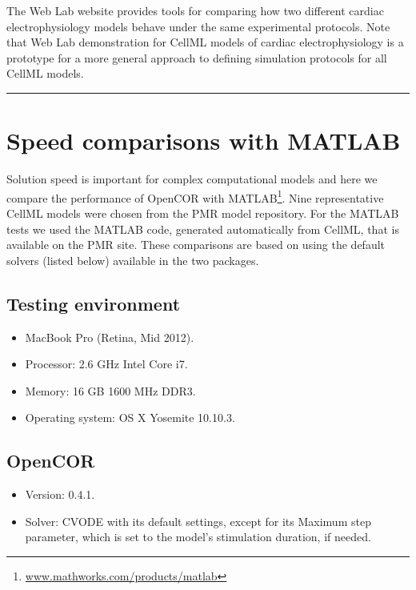 \documentclass[a4paper,10pt,english]{sphinxmanual}
\begin{document}
The Web Lab website provides tools for comparing how two different cardiac electrophysiology models behave under the same experimental protocols. Note that Web Lab demonstration for CellML models of cardiac electrophysiology is a prototype for a more general approach to defining simulation protocols for all CellML models.


\bigskip\hrule{}\bigskip



\chapter{Speed comparisons with MATLAB}
\label{speed_comp::doc}\label{speed_comp:speed-comparisons-with-matlab}
Solution speed is important for complex computational models and here we
compare the performance of OpenCOR with MATLAB\footnote[1]{
\href{http://www.mathworks.com/products/matlab}{www.mathworks.com/products/matlab}
}. Nine
representative CellML models were chosen from the PMR model repository.
For the MATLAB tests we used the MATLAB code, generated automatically
from CellML, that is available on the PMR site. These comparisons are
based on using the default solvers (listed below) available in the two
packages.


\section{Testing environment}
\label{speed_comp:testing-environment}\begin{itemize}
\item {} 
MacBook Pro (Retina, Mid 2012).

\item {} 
Processor: 2.6 GHz Intel Core i7.

\item {} 
Memory: 16 GB 1600 MHz DDR3.

\item {} 
Operating system: OS X Yosemite 10.10.3.

\end{itemize}


\section{OpenCOR}
\label{speed_comp:id2}\begin{itemize}
\item {} 
Version: 0.4.1.

\item {} 
Solver: CVODE with its default settings, except for its Maximum step
parameter, which is set to the model's stimulation duration, if
needed.

\end{itemize}
\end{document}

